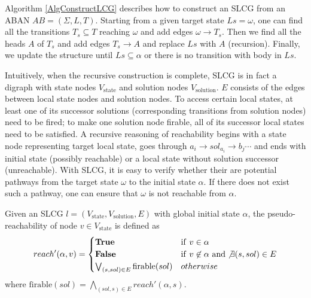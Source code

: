 Algorithm \ref{AlgConstructLCG} describes how to construct an SLCG from an ABAN $AB = (\Sigma,L,T)$.
Starting from  a given target state $Ls=\omega$, one can find all the transitions $T_s\subseteq T$ reaching $\omega$ and add edges $\omega \to T_s$.
Then we find all the heads $A$ of $T_s$ and add edges $T_s \to A$ and replace $Ls$ with $A$ (recursion).
Finally, we update the structure until $Ls\subseteq \alpha$ or there is no transition with body in $Ls$.

Intuitively, when the recursive construction is complete, SLCG is in fact a digraph with state nodes $V_{\mathrm{state}}$ and solution nodes $V_{\mathrm{solution}}$. 
$E$ consists of the edges between local state nodes and solution nodes. 
To access certain local states, at least one of its successor solutions (corresponding transitions from solution nodes) need to be fired; to make one solution node firable, all of its successor local states need to be satisfied. 
A recursive reasoning of reachability begins with a state node representing target local state, goes through $a_i\to sol_{a_i}\to b_j \cdots$ and ends with initial state (possibly reachable) or a local state without solution successor (unreachable). 
With SLCG, it is easy to verify whether their are potential pathways from the target state $\omega$ to the initial state $\alpha$.
If there does not exist such a pathway, one can ensure that $\omega$ is not reachable from $\alpha$.

\begin{definition}\label{defPseudoReach}
Given an SLCG $l=(V_{\mathrm{state}},V_{\mathrm{solution}},E)$ with global initial state $\alpha$, the pseudo-reachability of node $v\in V_{\mathrm{state}}$ is defined as
\begin{equation}
\nonumber
    reach'(\alpha,v)=
    \begin{cases}
        \mathrm{\bf True} & {\rm if\ } v\in \alpha\\
        \mathrm{\bf False} & {\rm if\ } v\not\in \alpha\ {\rm and} \not\exists(s,sol) \in E\\
        \bigvee_{(s,sol) \in E} \mathrm{firable}(sol) & otherwise
    \end{cases}
\end{equation}
where $\mathrm{firable}(sol)=\bigwedge_{(sol,s)\in E} reach'(\alpha,s)$. 

\end{definition}

